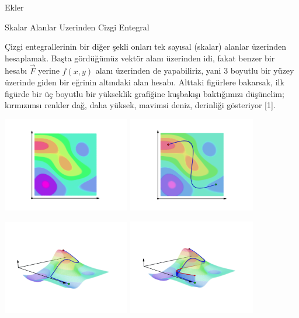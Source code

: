 \documentclass[12pt,fleqn]{article}\usepackage{../../common}
\begin{document}
Ekler

Skalar Alanlar Uzerinden Cizgi Entegral

Çizgi entegrallerinin bir diğer şekli onları tek sayısal (skalar) alanlar
üzerinden hesaplamak. Başta gördüğümüz vektör alanı üzerinden idi, fakat
benzer bir hesabı $\vec{F}$ yerine $f(x,y)$ alanı üzerinden de yapabiliriz,
yani 3 boyutlu bir yüzey üzerinde giden bir eğrinin altındaki alan
hesabı. Alttaki figürlere bakarsak, ilk figürde bir üç boyutlu bir
yükseklik grafiğine kuşbakışı baktığımızı düşünelim; kırmızımsı renkler
dağ, daha yüksek, mavimsi deniz, derinliği gösteriyor [1]. 

\includegraphics[width=15em]{19_line_ex1_01.png}
\includegraphics[width=15em]{19_line_ex1_02.png}

\includegraphics[width=15em]{19_line_ex1_03.png}
\includegraphics[width=15em]{19_line_ex1_04.png}
\end{document}
